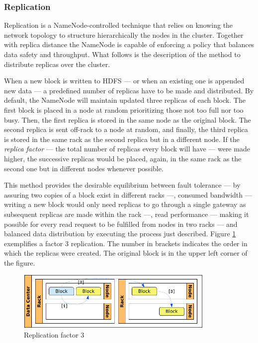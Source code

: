\subsubsection{Replication}\label{subsubsec:replicacionbloques}
\noindent Replication is a NameNode-controlled technique that relies on knowing the network topology to structure hierarchically the nodes in the cluster. Together with replica distance the NameNode is capable of enforcing a policy that balances data safety and throughput. What follows is the description of the method to distribute replicas over the cluster.

When a new block is written to HDFS --- or when an existing one is appended new data --- a predefined number of replicas have to be made and distributed. By default, the NameNode will maintain updated three replicas of each block. The first block is placed in a node at random prioritizing those not too full nor too busy. Then, the first replica is stored in the same node as the original block. The second replica is sent off-rack to a node at random, and finally, the third replica is stored in the same rack as the second replica but in a different node. If the \emph{replica factor} --- the total number of replicas every block will have --- were made higher, the successive replicas would be placed, again, in the same rack as the second one but in different nodes whenever possible.

This method provides the desirable equilibrium between fault tolerance --- by assuring two copies of a block exist in different racks ---, consumed bandwidth --- writing a new block would only need replicas to go through a single gateway as subsequent replicas are made within the rack ---, read performance --- making it possible for every read request to be fulfilled from nodes in two racks --- and balanced data distribution by executing the process just described. Figure \ref{fig:repbloque} exemplifies a factor 3 replication. The number in brackets indicates the order in which the replicas were created. The original block is in the upper left corner of the figure.

\begin{figure}[tbp]
\begin{center}
\includegraphics[width=0.85\textwidth]{imagenes/019.pdf}
 \caption{Replication factor 3}
\label{fig:repbloque}
\end{center}
\end{figure}


